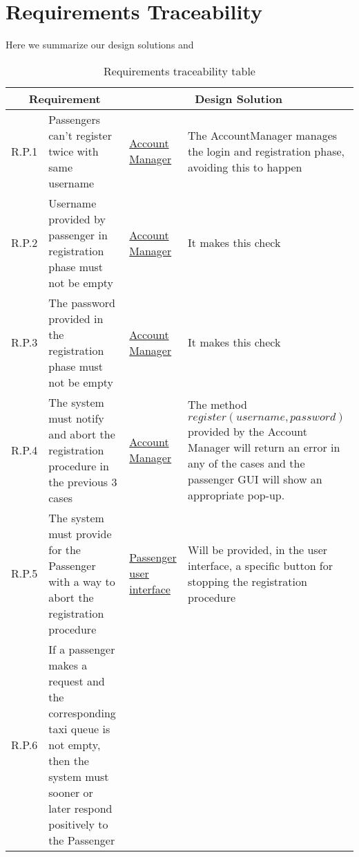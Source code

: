 \chapter{Requirements Traceability}\label{chapter:requirementsTraceability}
Here we summarize our design solutions and 
\begin{table}[H]
\centering
\begin{longtable}{|p{}|p{}|p{}|p{}|}
\hline
\multicolumn{2}{|c|}{\textbf{Requirement}} & \multicolumn{2}{c|}{\textbf{Design Solution}} \\ \hline
R.P.1 & Passengers can't register twice with same username & \hyperref[comp:accountManager]{Account Manager} & The AccountManager manages the login and registration phase, avoiding this to happen  \\ \hline
R.P.2 & Username provided by passenger in registration phase must not be empty & \hyperref[comp:accountManager]{Account Manager} & It makes this check \\ \hline
R.P.3 & The password provided in the registration phase must not be empty & \hyperref[comp:accountManager]{Account Manager} & It makes this check \\ \hline
R.P.4 & The system must notify and abort the registration procedure in the previous 3 cases & \hyperref[comp:accountManager]{Account Manager} & The method $register(username,password)$ provided by the Account Manager will return an error in any of the cases and the passenger GUI will show an appropriate pop-up. \\ \hline
R.P.5 & The system must provide for the Passenger with a way to abort the registration procedure & \hyperref[ux:passengerApp]{Passenger user interface} & Will be provided, in the user interface, a specific button for stopping the registration procedure \\ \hline
R.P.6 & If a passenger makes a request and the corresponding taxi queue is not empty, then the system must sooner or later respond positively to the Passenger & 	
\end{longtable} 
\caption{Requirements traceability table}
\label{tab:reqTraceTable}
\end{table}